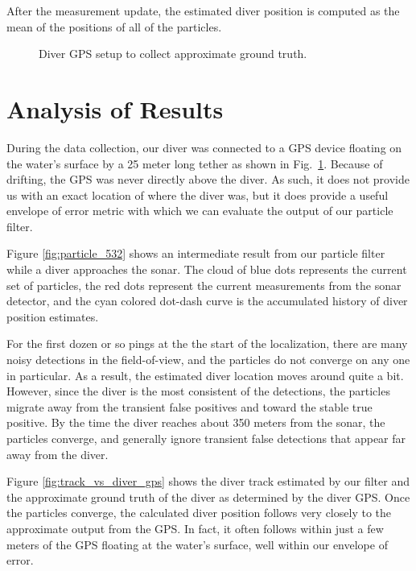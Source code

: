 \documentclass{article} %
\begin{document}
After the measurement update, the estimated diver position is computed as the mean of the positions of all of the particles.

\begin{figure}[htpb]
  \centering
  \caption{Diver GPS setup to collect approximate ground truth.}
  \label{fig:diver_gps_setup}
\end{figure}

\section{Analysis of Results}
During the data collection, our diver was connected to a GPS device floating on the water's surface by a 25 meter long tether as shown in Fig.~\ref{fig:diver_gps_setup}. Because of drifting, the GPS was never directly above the diver. As such, it does not provide us with an exact location of where the diver was, but it does provide a useful envelope of error metric with which we can evaluate the output of our particle filter.

Figure \ref{fig:particle_532} shows an intermediate result from our particle filter while a diver approaches the sonar. The cloud of blue dots represents the current set of particles, the red dots represent the current measurements from the sonar detector, and the cyan colored dot-dash curve is the accumulated history of diver position estimates.

For the first dozen or so pings at the the start of the localization, there are many noisy detections in the field-of-view, and the particles do not converge on any one in particular. As a result, the estimated diver location moves around quite a bit. However, since the diver is the most consistent of the detections, the particles migrate away from the transient false positives and toward the stable true positive. By the time the diver reaches about 350 meters from the sonar, the particles converge, and generally ignore transient false detections that appear far away from the diver.

Figure \ref{fig:track_vs_diver_gps} shows the diver track estimated by our filter and the approximate ground truth of the diver as determined by the diver GPS. Once the particles converge, the calculated diver position follows very closely to the approximate output from the GPS. In fact, it often follows within just a few meters of the GPS floating at the water's surface, well within our envelope of error.
\end{document}
